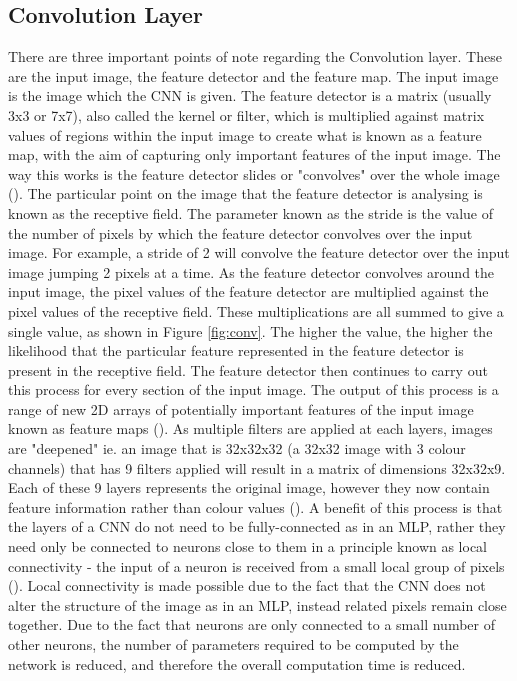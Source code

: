 \documentclass[12pt]{report}
\begin{document}
\subsection{Convolution Layer}
\begin{flushleft}
There are three important points of note regarding the Convolution layer. These are the input image, the feature detector and the feature map. The input image is the image which the CNN is given. The feature detector is a matrix (usually 3x3 or 7x7), also called the kernel or filter, which is multiplied against matrix values of regions within the input image to create what is known as a feature map, with the aim of capturing only important features of the input image. The way this works is the feature detector slides or "convolves" over the whole image (\cite{o2015introduction}). The particular point on the image that the feature detector is analysing is known as the receptive field. 
\linebreak
\linebreak
The parameter known as the stride is the value of the number of pixels by which the feature detector convolves over the input image. For example, a stride of 2 will convolve the feature detector over the input image jumping 2 pixels at a time. As the feature detector convolves around the input image, the pixel values of the feature detector are multiplied against the pixel values of the receptive field. These multiplications are all summed to give a single value, as shown in Figure \ref{fig:conv}. The higher the value, the higher the likelihood that the particular feature represented in the feature detector is present in the receptive field. The feature detector then continues to carry out this process for every section of the input image. The output of this process is a range of new 2D arrays of potentially important features of the input image known as feature maps (\cite{zhao2019object}). As multiple filters are applied at each layers, images are "deepened" ie. an image that is 32x32x32 (a 32x32 image with 3 colour channels) that has 9 filters applied will result in a matrix of dimensions 32x32x9. Each of these 9 layers represents the original image, however they now contain feature information rather than colour values (\cite{lecun1995convolutional}).
\linebreak
\linebreak
A benefit of this process is that the layers of a CNN do not need to be fully-connected as in an MLP, rather they need only be connected to neurons close to them in a principle known as local connectivity - the input of a neuron is received from a small local group of pixels (\cite{lecun1995convolutional}). Local connectivity is made possible due to the fact that the CNN does not alter the structure of the image as in an MLP, instead related pixels remain close together. Due to the fact that neurons are only connected to a small number of other neurons, the number of parameters required to be computed by the network is reduced, and therefore the overall computation time is reduced.
\end{flushleft}
\end{document}
